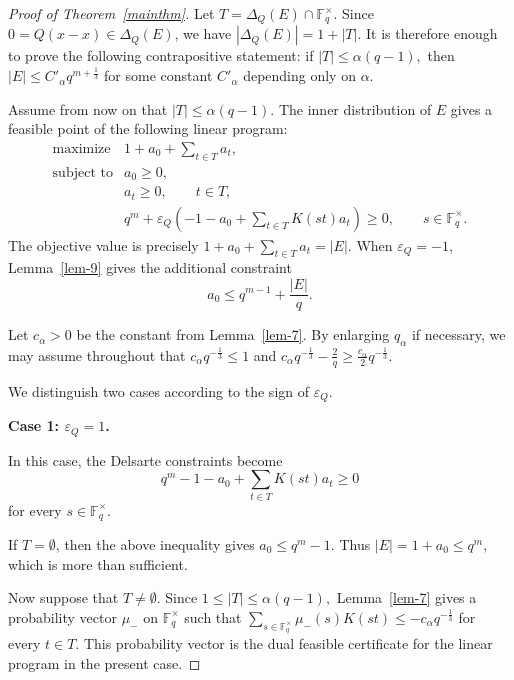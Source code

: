 \documentclass[11pt]{article}
\newcommand{\F}{\mathbb{F}}
\newcommand{\1}{\mathbf{1}}
\begin{document}
\begin{proof}[Proof of Theorem~\ref{mainthm}]
	Let $T=\Delta_Q(E)\cap\F_q^\times.$
	Since \(0=Q(x-x)\in\Delta_Q(E)\), we have $	|\Delta_Q(E)|=1+|T|.$
	It is therefore enough to prove the following contrapositive statement: if $|T|\le \alpha(q-1),$
	then $|E|\le C'_\alpha q^{m+\frac13}$
	for some constant \(C'_\alpha\) depending only on \(\alpha\).
	
	Assume from now on that $|T|\le \alpha(q-1).$
	The inner distribution of \(E\) gives a feasible point of the following
	linear program:
	\[
	\begin{array}{ll}
		\text{maximize}
		&
		1+a_0+\displaystyle\sum_{t\in T}a_t,\\[2mm]
		\text{subject to}
		&
		a_0\ge0,\\[1mm]
		&
		a_t\ge0,\qquad t\in T,\\[1mm]
		&
		q^m+\varepsilon_Q
		\left(
		-1-a_0+\displaystyle\sum_{t\in T}K(st)a_t
		\right)
		\ge0,
		\qquad s\in\F_q^\times.
	\end{array}
	\tag{LP}
	\]
	The objective value is precisely $1+a_0+\sum_{t\in T}a_t=|E|.$
	When \(\varepsilon_Q=-1\), Lemma~\ref{lem-9} gives the additional constraint
	\[
	a_0\le q^{m-1}+\frac{|E|}{q}.
	\tag{Z}
	\]
	
	Let \(c_\alpha>0\) be the constant from Lemma~\ref{lem-7}. By enlarging
	\(q_\alpha\) if necessary, we may assume throughout that $c_\alpha q^{-\frac{1}{3}}\le1$
	and $c_\alpha q^{-\frac{1}{3}}-\frac{2}{q}
	\ge
	\frac{c_\alpha}{2}q^{-\frac{1}{3}}.$
	
	We distinguish two cases according to the sign of \(\varepsilon_Q\).
	
	\medskip
	
	\noindent
	\textbf{Case 1: \(\varepsilon_Q=1\).}
	
	In this case, the Delsarte constraints become
	\[
	q^m-1-a_0+\sum_{t\in T}K(st)a_t\ge0
	\]
	for every \(s\in\F_q^\times\).
	
	If \(T=\emptyset\), then the above inequality gives $a_0\le q^m-1.$
	Thus $|E|=1+a_0\le q^m,$
	which is more than sufficient.
	
	Now suppose that \(T\ne\emptyset\). Since $1\le |T|\le \alpha(q-1),$
	Lemma~\ref{lem-7} gives a probability vector \(\mu_-\) on
	\(\F_q^\times\) such that $\sum_{s\in\F_q^\times}\mu_-(s)K(st)
	\le
	-c_\alpha q^{-\frac{1}{3}}$
	for every \(t\in T\). This probability vector is the dual feasible
	certificate for the linear program in the present case.
	

\end{proof}
\end{document}
